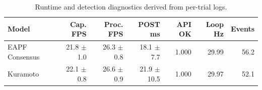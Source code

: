 \begin{table}[htbp]
\centering
\footnotesize
\caption{Runtime and detection diagnostics derived from per-trial logs.}
\label{tab:runtime}
\begin{tabular}{@{}lrrrrrr@{}}
\toprule
\textbf{Model} & \textbf{Cap. FPS} & \textbf{Proc. FPS} & \textbf{POST ms} & \textbf{API OK} & \textbf{Loop Hz} & \textbf{Events} \\
\midrule
EAPF Consensus & 21.8 $\pm$ 1.0 & 26.3 $\pm$ 0.8 & 18.1 $\pm$ 7.7 & 1.000 & 29.99 & 56.2 \\
Kuramoto & 22.1 $\pm$ 0.8 & 26.6 $\pm$ 0.9 & 21.9 $\pm$ 10.5 & 1.000 & 29.97 & 52.1 \\
\bottomrule
\end{tabular}
\end{table}
